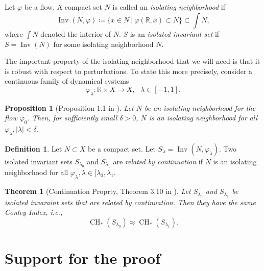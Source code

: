 \documentclass{article}
\newtheorem{theorem}{Theorem}
\newtheorem{proposition}{Proposition}
\theoremstyle{definition}
\newtheorem{definition}{Definition}
\theoremstyle{remark}
\newcommand{\reals}{\mathbb{R}}
\newcommand{\inv}{\operatorname{Inv}}
\newcounter{ct}
\begin{document}
Let $\varphi$ be a flow. A compact set $N$ is called an \emph{isolating neighborhood} if 
\[
\inv(N,\varphi) \coloneqq \{x\in N\ | \ \varphi(\reals,x)\subset N\} \subset \int N,
\]
where $\int N$ denoted the interior of $N$. 
$S$ is an \emph{isolated invariant set} if $S=\inv(N)$ for some isolating neighborhood $N$.

The important property of the isolating neighborhood that we will need is that it is robust with respect to perturbations. To state this more precisely, consider a continuous family of dynamical systems
\begin{equation}
\varphi_\lambda\colon \reals\times X\rightarrow X, \ \ \ \lambda\in[-1,1].
\end{equation}

\begin{proposition}[Proposition 1.1 in \citep{mischaikow1999cit}]
Let $N$ be an isolating neighborhood for the flow $\varphi_0$. Then, for sufficiently small $\delta>0$, $N$ is an isolating neighborhood for all $\varphi_\lambda, |\lambda|<\delta$.
\end{proposition}

\begin{definition}
Let $N\subset X$ be a compact set. 
Let $S_\lambda = \inv(N,\varphi_\lambda).$
Two isolated invariant sets $S_{\lambda_0}$ and $S_{\lambda_1}$ are \emph{related by continuation} if $N$ is an isolating neighborhood for all $\varphi_\lambda, \lambda\in[\lambda_0,\lambda_1$.
\end{definition}

\begin{theorem}[Continuation Proprty, Theorem 3.10 in \citep{mischaikow1999cit}]
Let $S_{\lambda_0}$ and $S_{\lambda_1}$ be isolated invaraint sets that are related by continuation. 
Then they have the same Conley Index, i.e.,
\[
\operatorname{CH}_*(S_{\lambda_0})\approx \operatorname{CH}_*(S_{\lambda_1}).
\]
\end{theorem}

\section{Support for the proof}
\end{document}
